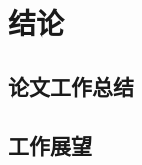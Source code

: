\section*{结论}

{
\renewcommand{\thesubsection}{\arabic{subsection}.}
\setcounter{subsection}{0}
\subsection{论文工作总结}

\subsection{工作展望}
}


\newpage
